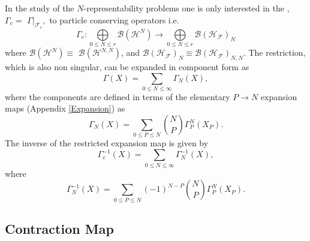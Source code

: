 \documentclass[aps,preprint]{revtex4}%
\begin{document}
In the study of the $N$-representability problems one is only interested in
the , $\Gamma_{e}=$ $\left.  \Gamma\right\vert _{\mathcal{F}_{e}},$ to
particle conserving operators i.e.
\begin{equation}
\Gamma_{e}:%
{\displaystyle\bigoplus\limits_{0\leq N\leq r}}
\mathcal{B}\left(  \mathcal{H}^{N}\right)  \rightarrow%
{\displaystyle\bigoplus\limits_{0\leq N\leq r}}
\mathcal{B}\left(  \mathcal{H}_{\mathcal{F}}\right)  _{N}%
\end{equation}
where $\mathcal{B}\left(  \mathcal{H}^{N}\right)  \equiv$ $\mathcal{B}\left(
\mathcal{H}^{N,N}\right)  $, and $\mathcal{B}\left(  \mathcal{H}_{\mathcal{F}%
}\right)  _{N}\equiv\mathcal{B}\left(  \mathcal{H}_{\mathcal{F}}\right)
_{N,N}.$ The restriction, which is also non singular, can be expanded in
component form as
\begin{equation}
\Gamma\left(  X\right)  =\sum_{0\leq N\leq\infty}\Gamma_{N}\left(  X\right)  ,
\end{equation}
where the components are defined in terms of the elementary $P\rightarrow N$
expansion maps \cite{Kummar} (Appendix \ref{Expansion}) as
\begin{equation}
\Gamma_{N}\left(  X\right)  =\sum_{0\leq P\leq N}\binom{N}{P}\Gamma_{P}%
^{N}\left(  X_{P}\right)  .
\end{equation}
The inverse of the restricted expansion map is given by \cite{Kummar70}
\begin{equation}
\Gamma_{e}^{-1}\left(  X\right)  =\sum_{0\leq N\leq\infty}\Gamma_{N}%
^{-1}\left(  X\right)  ,
\end{equation}
where%
\begin{equation}
\Gamma_{N}^{-1}\left(  X\right)  =\sum_{0\leq P\leq N}\left(  -1\right)
^{N-P}\binom{N}{P}\Gamma_{P}^{N}\left(  X_{P}\right)  .
\end{equation}


\subsection{Contraction Map \label{Contraction copy(1)}}
\end{document}

